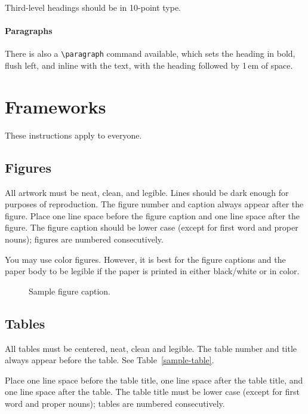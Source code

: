 \documentclass{article}
\begin{document}
Third-level headings should be in 10-point type.

\paragraph{Paragraphs}

There is also a \verb+\paragraph+ command available, which sets the
heading in bold, flush left, and inline with the text, with the
heading followed by 1\,em of space.

\section{Frameworks}
\label{sec:frameworks}

These instructions apply to everyone.

\subsection{Figures}

All artwork must be neat, clean, and legible. Lines should be dark
enough for purposes of reproduction. The figure number and caption
always appear after the figure. Place one line space before the figure
caption and one line space after the figure. The figure caption should
be lower case (except for first word and proper nouns); figures are
numbered consecutively.

You may use color figures. However, it is best for the figure
captions and the paper body to be legible if the paper is printed in
either black/white or in color.
\begin{figure}[h]
    \centering
    \fbox{\rule[-.5cm]{0cm}{4cm} \rule[-.5cm]{4cm}{0cm}}
    \caption{Sample figure caption.}
\end{figure}

\subsection{Tables}

All tables must be centered, neat, clean and legible. The table
number and title always appear before the table. See
Table~\ref{sample-table}.

Place one line space before the table title, one line space after the
table title, and one line space after the table. The table title must
be lower case (except for first word and proper nouns); tables are
numbered consecutively.
\end{document}
